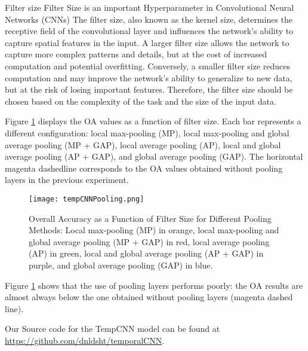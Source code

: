 \begin{paragraph}{Filter size}
Filter Size is an important Hyperparameter in Convolutional Neural Networks (CNNs)
The filter size, also known as the kernel size, determines the receptive field of the convolutional layer and influences the network's ability to capture spatial features in the input.
A larger filter size allows the network to capture more complex patterns and details, but at the cost of increased computation and potential overfitting.
Conversely, a smaller filter size reduces computation and may improve the network's ability to generalize to new data, but at the risk of losing important features.
Therefore, the filter size should be chosen based on the complexity of the task and the size of the input data.
\end{paragraph}


Figure \ref{tab:tempCNNPooling} displays the OA values as a function of filter size. 
Each bar represents a different configuration: local max-pooling (MP), local max-pooling and global average pooling (MP + GAP), local average pooling (AP), local and global average pooling (AP + GAP), and global average pooling (GAP). 
The horizontal magenta dashedline corresponds to the OA values obtained without pooling layers in the previous experiment.


\begin{figure}[H]
  \centering
  \texttt{[image: tempCNNPooling.png]}
  \caption{Overall Accuracy as a Function of Filter Size for Different Pooling Methods: Local max-pooling (MP) in orange, local max-pooling and global average pooling (MP + GAP) in red, local average pooling (AP) in green, local and global average pooling (AP + GAP) in purple, and global average pooling (GAP) in blue.}
  \label{tab:tempCNNPooling}
\end{figure}

Figure \ref{tab:tempCNNPooling} shows that the use of pooling layers performs poorly: the OA results are almost always
below the one obtained without pooling layers (magenta dashed line). 





Our Source code for the TempCNN model can be found at \url{https://github.com/dnldsht/temporalCNN}.